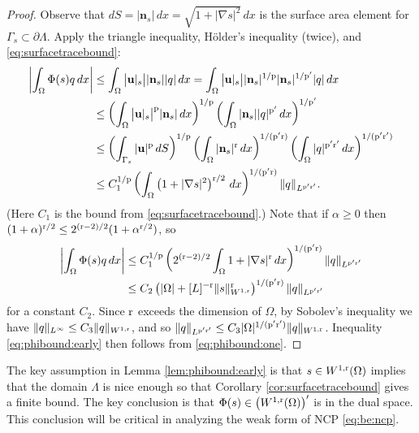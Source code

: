 \documentclass[hidelinks,onefignum,onetabnum,final]{siamart220329}  %
\newcommand{\grad}{\nabla}
\newcommand{\bn}{\mathbf{n}}
\newcommand{\bu}{\mathbf{u}}
\newcommand{\pp}{{\text{\textnormal{p}}}}
\newcommand{\rr}{{\text{\textnormal{r}}}}
\begin{document}
\begin{proof}  Observe that $dS = |\bn_s|\,dx = \sqrt{1+|\grad s|^2}\,dx$ is the surface area element for $\Gamma_s \subset \partial \Lambda$.  Apply the triangle inequality, H\"older's inequality (twice), and \eqref{eq:surfacetracebound}:
\begin{align}
\left|\int_\Omega \Phi(s) q\,dx\right| &\le \int_\Omega \big|\bu|_s\big| |\bn_s| |q|\,dx = \int_\Omega \big|\bu|_s\big| |\bn_s|^{1/\pp} |\bn_s|^{1/\pp'} |q|\,dx \label{eq:phibound:zero} \\
    &\le \left(\int_\Omega \big|\bu|_s\big|^\pp |\bn_s|\,dx\right)^{1/\pp} \left(\int_\Omega |\bn_s| |q|^{\pp'} \,dx\right)^{1/\pp'} \notag \\
    &\le \left(\int_{\Gamma_s} |\bu|^\pp \,dS\right)^{1/\pp} \left(\int_\Omega |\bn_s|^\rr \,dx\right)^{1/(\pp'\rr)} \left(\int_\Omega |q|^{\pp'\rr'} \,dx\right)^{1/(\pp'\rr')} \notag \\
    &\le C_1^{1/\pp} \left(\int_\Omega \left(1+|\grad s|^2\right)^{\rr/2}\,dx\right)^{1/(\pp'\rr)} \|q\|_{L^{\pp'\rr'}}. \notag
\end{align}
(Here $C_1$ is the bound from \eqref{eq:surfacetracebound}.)  Note that if $\alpha\ge 0$ then $(1+\alpha)^{\rr/2} \le 2^{(\rr-2)/2} (1+\alpha^{\rr/2})$, so
\begin{align}
\left|\int_\Omega \Phi(s) q\,dx\right| &\le C_1^{1/\pp} \left(2^{(\rr-2)/2} \int_\Omega 1 + |\grad s|^\rr\,dx\right)^{1/(\pp'\rr)} \|q\|_{L^{\pp'\rr'}} \label{eq:phibound:one} \\
  &\le C_2 \left(|\Omega| + [L]^{-\rr}\|s\|_{W^{1,\rr}}^\rr\right)^{1/(\pp'\rr)} \|q\|_{L^{\pp'\rr'}} \notag
\end{align}
for a constant $C_2$.  Since $\rr$ exceeds the dimension of $\Omega$, by Sobolev's inequality \cite[Theorem 5.6.5]{Evans2010} we have $\|q\|_{L^\infty} \le C_3 \|q\|_{W^{1,\rr}}$, and so $\|q\|_{L^{\pp'\rr'}} \le C_3 |\Omega|^{1/(\pp'\rr')} \|q\|_{W^{1,\rr}}$.  Inequality \eqref{eq:phibound:early} then follows from \eqref{eq:phibound:one}.
\end{proof}

The key assumption in Lemma \ref{lem:phibound:early} is that $s\in W^{1,\rr}(\Omega)$ implies that the domain $\Lambda$ is nice enough so that Corollary \ref{cor:surfacetracebound} gives a finite bound.  The key conclusion is that $\Phi(s) \in \left(W^{1,\rr}(\Omega)\right)'$ is in the dual space.  This conclusion will be critical in analyzing the weak form of NCP \eqref{eq:be:ncp}.
\end{document}
